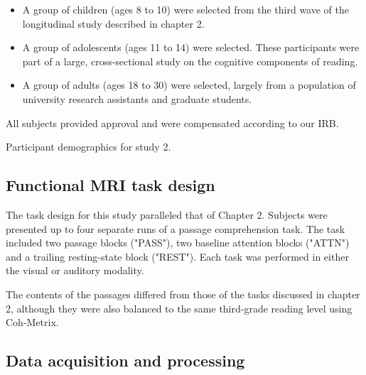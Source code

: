 \begin{itemize}
	\item A group of children (ages 8 to 10) were selected from the third wave of the longitudinal study described in chapter 2. 
	\item A group of adolescents (ages 11 to 14) were selected. These participants were part of a large, cross-sectional study on the cognitive components of reading.
	\item A group of adults (ages 18 to 30) were selected, largely from a population of university research assistants and graduate students.
\end{itemize}

All subjects provided approval and were compensated according to our IRB.

\begin{table}[t]
	\renewcommand{\tabcolsep}{0.09cm}
	\centering
	
	\caption{Participant demographics for study 2.}
	\label{table:ch4-participants}
\end{table}



\subsection{Functional MRI task design}

The task design for this study paralleled that of Chapter 2. Subjects were presented up to four separate runs of a passage comprehension task. The task included two passage blocks ("PASS"), two baseline attention blocks ("ATTN") and a trailing resting-state block ("REST"). Each task was performed in either the visual or auditory modality.

The contents of the passages differed from those of the tasks discussed in chapter 2, although they were also balanced to the same third-grade reading level using Coh-Metrix. 

\subsection{Data acquisition and processing}

